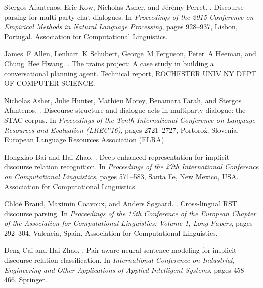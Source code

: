 \documentclass[11pt]{article}
\begin{document}
\newpage
\begin{thebibliography}{}

Stergos Afantenos, Eric Kow, Nicholas Asher, and J{\'e}r{\'e}my Perret.
.
\newblock Discourse parsing for multi-party chat dialogues.
\newblock In {\em Proceedings of the 2015 Conference on Empirical Methods in
  Natural Language Processing}, pages 928--937, Lisbon, Portugal. Association
  for Computational Linguistics.

James~F Allen, Lenhart~K Schubert, George~M Ferguson, Peter~A Heeman, and
  Chung~Hee Hwang.
.
\newblock The trains project: A case study in building a conversational
  planning agent.
\newblock Technical report, ROCHESTER UNIV NY DEPT OF COMPUTER SCIENCE.

Nicholas Asher, Julie Hunter, Mathieu Morey, Benamara Farah, and Stergos
  Afantenos.
.
\newblock Discourse structure and dialogue acts in multiparty dialogue: the
  {STAC} corpus.
\newblock In {\em Proceedings of the Tenth International Conference on Language
  Resources and Evaluation ({LREC}'16)}, pages 2721--2727, Portoro{\v{z}},
  Slovenia. European Language Resources Association (ELRA).

Hongxiao Bai and Hai Zhao.
.
\newblock Deep enhanced representation for implicit discourse relation
  recognition.
\newblock In {\em Proceedings of the 27th International Conference on
  Computational Linguistics}, pages 571--583, Santa Fe, New Mexico, USA.
  Association for Computational Linguistics.

Chlo{\'e} Braud, Maximin Coavoux, and Anders S{\o}gaard.
.
\newblock Cross-lingual {RST} discourse parsing.
\newblock In {\em Proceedings of the 15th Conference of the {E}uropean Chapter
  of the Association for Computational Linguistics: Volume 1, Long Papers},
  pages 292--304, Valencia, Spain. Association for Computational Linguistics.

Deng Cai and Hai Zhao.
.
\newblock Pair-aware neural sentence modeling for implicit discourse relation
  classification.
\newblock In {\em International Conference on Industrial, Engineering and Other
  Applications of Applied Intelligent Systems}, pages 458--466. Springer.


\end{thebibliography}
\end{document}
